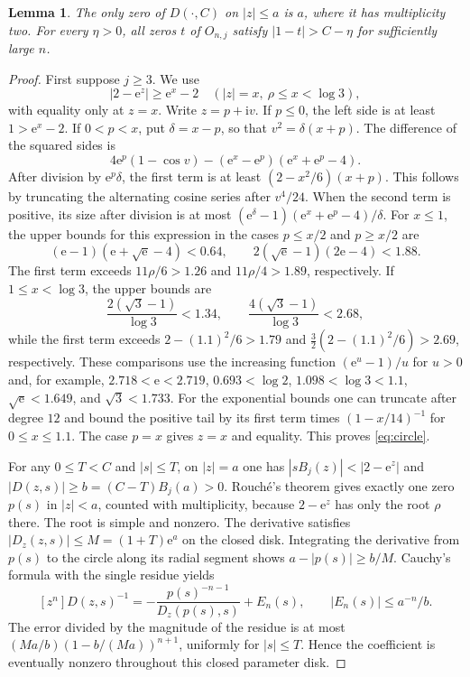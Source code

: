 \documentclass[11pt]{article}
\newtheorem{lemma}[theorem]{Lemma}
\newcommand{\ee}{\mathrm e}
\newcommand{\ii}{\mathrm i}
\begin{document}
\begin{lemma}\label{lem:disk}
The only zero of $D(\cdot,C)$ on $|z|\le a$ is $a$, where it has
multiplicity two. For every $\eta>0$, all zeros $t$ of $O_{n,j}$ satisfy
$|1-t|>C-\eta$ for sufficiently large $n$.
\end{lemma}

\begin{proof}
First suppose $j\ge3$. We use
\begin{equation}\label{eq:circle}
 |2-\ee^z|\ge \ee^x-2\quad (|z|=x,\ \rho\le x<\log 3),
\end{equation}
with equality only at $z=x$. Write $z=p+\ii v$. If $p\le0$, the
left side is at least $1>\ee^x-2$. If $0<p<x$, put $\delta=x-p$,
so that $v^2=\delta(x+p)$. The difference of the squared sides is
\[
 4\ee^p(1-\cos v)-(\ee^x-\ee^p)(\ee^x+\ee^p-4).
\]
After division by $\ee^p\delta$, the first term is at least
$(2-x^2/6)(x+p)$. This follows by truncating the alternating cosine
series after $v^4/24$. When the second term is positive, its size
after division is at most
$(\ee^\delta-1)(\ee^x+\ee^p-4)/\delta$.
For $x\le1$, the upper bounds for this expression in the cases
$p\le x/2$ and $p\ge x/2$ are
\[
 (\ee-1)(\ee+\sqrt{\ee}-4)<0.64,
 \qquad 2(\sqrt{\ee}-1)(2\ee-4)<1.88.
\]
The first term exceeds $11\rho/6>1.26$ and $11\rho/4>1.89$,
respectively. If $1\le x<\log3$, the upper bounds are
\[
 \frac{2(\sqrt3-1)}{\log3}<1.34,
 \qquad\frac{4(\sqrt3-1)}{\log3}<2.68,
\]
while the first term exceeds $2-(1.1)^2/6>1.79$ and
$\tfrac32(2-(1.1)^2/6)>2.69$, respectively. These comparisons use
the increasing function $(\ee^u-1)/u$ for $u>0$ and, for example,
$2.718<\ee<2.719$, $0.693<\log2$, $1.098<\log3<1.1$,
$\sqrt{\ee}<1.649$, and $\sqrt3<1.733$. For the exponential
bounds one can truncate after degree $12$ and bound the positive
tail by its first term times $(1-x/14)^{-1}$ for $0\le x\le1.1$.
The case $p=x$ gives
$z=x$ and equality. This proves \eqref{eq:circle}.

For any $0\le T<C$ and $|s|\le T$, on $|z|=a$ one has
$|s B_j(z)|<|2-\ee^z|$ and
$|D(z,s)|\ge b=(C-T)B_j(a)>0$. Rouch\'e's theorem gives exactly one
zero $p(s)$ in $|z|<a$, counted with multiplicity, because
$2-\ee^z$ has only the root $\rho$ there. The root is simple and
nonzero. The derivative satisfies $|D_z(z,s)|\le M=(1+T)\ee^a$
on the closed disk. Integrating the derivative from $p(s)$ to the
circle along its radial segment shows $a-|p(s)|\ge b/M$.
Cauchy's formula with the single residue yields
\[
 [z^n]D(z,s)^{-1}=-\frac{p(s)^{-n-1}}{D_z(p(s),s)}+E_n(s),
 \qquad |E_n(s)|\le a^{-n}/b .
\]
The error divided by the magnitude of the residue is at most
$(Ma/b)(1-b/(Ma))^{n+1}$, uniformly for $|s|\le T$. Hence the coefficient
is eventually nonzero throughout this closed parameter disk.


\end{proof}
\end{document}
